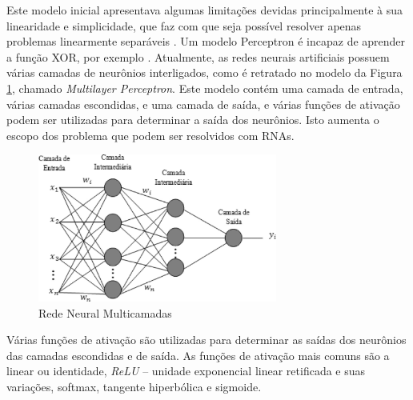 Este modelo inicial apresentava algumas limitações devidas principalmente à sua linearidade e simplicidade, que faz com que seja possível resolver apenas problemas linearmente separáveis \cite{braga2000redes}. Um modelo Perceptron é incapaz de aprender a função XOR, por exemplo \cite{goodfellow2016deep}. Atualmente, as redes neurais artificiais possuem várias camadas de neurônios interligados, como é retratado no modelo da Figura \ref{fig:mlp}, chamado \emph{Multilayer Perceptron}. Este modelo contém uma camada de entrada, várias camadas escondidas, e uma camada de saída, e várias funções de ativação podem ser utilizadas para determinar a saída dos neurônios. Isto aumenta o escopo dos problema que podem ser resolvidos com RNAs.

\begin{figure}[ht]
	\centering
	\includegraphics[width=0.7\textwidth]{img/mlprna.jpg}
	\caption{Rede Neural Multicamadas}
	\label{fig:mlp}
\end{figure}

Várias funções de ativação são utilizadas para determinar as saídas dos neurônios das camadas escondidas e de saída. As funções de ativação mais comuns são a linear ou identidade, \emph{ReLU} -- unidade exponencial linear retificada e suas variações, softmax, tangente hiperbólica e sigmoide.

